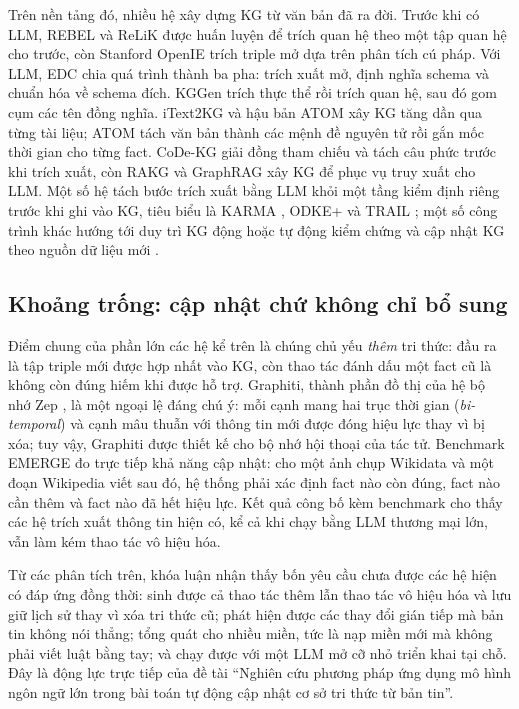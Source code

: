 Trên nền tảng đó, nhiều hệ xây dựng KG từ văn bản đã ra đời.
Trước khi có LLM, REBEL \cite{cabot2021rebel} và ReLiK \cite{orlando2024relik} được huấn luyện để trích quan hệ theo một tập quan hệ cho trước,
còn Stanford OpenIE \cite{angeli2015openie} trích triple mở dựa trên phân tích cú pháp.
Với LLM, EDC \cite{zhang2024edc} chia quá trình thành ba pha: trích xuất mở, định nghĩa schema và chuẩn hóa về schema đích.
KGGen \cite{mo2025kggen} trích thực thể rồi trích quan hệ, sau đó gom cụm các tên đồng nghĩa.
iText2KG \cite{lairgi2024itext2kg} và hậu bản ATOM \cite{lairgi2025atom} xây KG tăng dần qua từng tài liệu;
ATOM tách văn bản thành các mệnh đề nguyên tử rồi gắn mốc thời gian cho từng fact.
CoDe-KG \cite{codekg2025} giải đồng tham chiếu và tách câu phức trước khi trích xuất,
còn RAKG \cite{rakg2025} và GraphRAG \cite{edge2024graphrag} xây KG để phục vụ truy xuất cho LLM.
Một số hệ tách bước trích xuất bằng LLM khỏi một tầng kiểm định riêng trước khi ghi vào KG,
tiêu biểu là KARMA \cite{lu2025karma}, ODKE+ \cite{odke2025} và TRAIL \cite{trail2026};
một số công trình khác hướng tới duy trì KG động
hoặc tự động kiểm chứng và cập nhật KG theo nguồn dữ liệu mới \cite{dynamo2025,autovu2025,tong2024}.

\subsection{Khoảng trống: cập nhật chứ không chỉ bổ sung}
\label{sec:intro-gap}

Điểm chung của phần lớn các hệ kể trên là chúng chủ yếu \emph{thêm} tri thức:
đầu ra là tập triple mới được hợp nhất vào KG, còn thao tác đánh dấu một fact cũ là không còn đúng hiếm khi được hỗ trợ.
Graphiti, thành phần đồ thị của hệ bộ nhớ Zep \cite{rasmussen2025zep}, là một ngoại lệ đáng chú ý:
mỗi cạnh mang hai trục thời gian (\textit{bi-temporal}) và cạnh mâu thuẫn với thông tin mới được đóng hiệu lực thay vì bị xóa;
tuy vậy, Graphiti được thiết kế cho bộ nhớ hội thoại của tác tử.
Benchmark EMERGE \cite{zaporojets2025emerge} đo trực tiếp khả năng cập nhật:
cho một ảnh chụp Wikidata và một đoạn Wikipedia viết sau đó,
hệ thống phải xác định fact nào còn đúng, fact nào cần thêm và fact nào đã hết hiệu lực.
Kết quả công bố kèm benchmark cho thấy các hệ trích xuất thông tin hiện có,
kể cả khi chạy bằng LLM thương mại lớn, vẫn làm kém thao tác vô hiệu hóa.

Từ các phân tích trên, khóa luận nhận thấy bốn yêu cầu chưa được các hệ hiện có đáp ứng đồng thời:
sinh được cả thao tác thêm lẫn thao tác vô hiệu hóa và lưu giữ lịch sử thay vì xóa tri thức cũ;
phát hiện được các thay đổi gián tiếp mà bản tin không nói thẳng;
tổng quát cho nhiều miền, tức là nạp miền mới mà không phải viết luật bằng tay;
và chạy được với một LLM mở cỡ nhỏ triển khai tại chỗ. Đây là động lực trực tiếp của đề tài
``Nghiên cứu phương pháp ứng dụng mô hình ngôn ngữ lớn trong bài toán tự động cập nhật cơ sở tri thức từ bản tin''.

